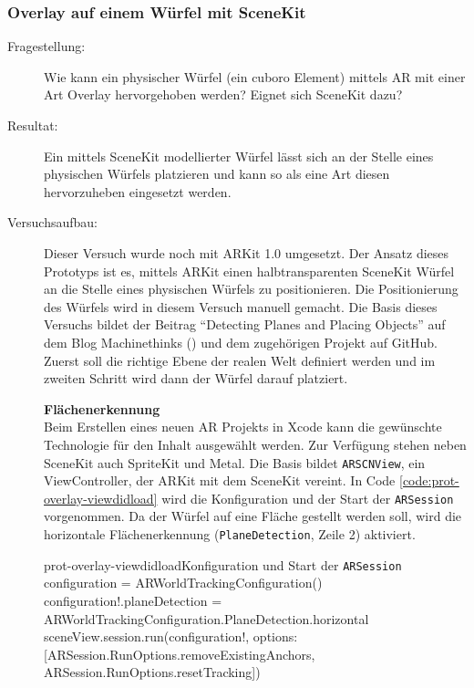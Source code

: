 \subsubsection{Overlay auf einem Würfel mit SceneKit}\label{subsub:prot-overlay}
\begin{description}
	\item[Fragestellung:] Wie kann ein physischer Würfel (ein cuboro Element) mittels AR mit einer Art Overlay hervorgehoben werden? Eignet sich SceneKit dazu?
	\item[Resultat:] Ein mittels SceneKit modellierter Würfel lässt sich an der Stelle eines physischen Würfels platzieren und kann so als eine Art diesen hervorzuheben eingesetzt werden. %
	\item[Versuchsaufbau:] Dieser Versuch wurde noch mit ARKit 1.0 umgesetzt. Der Ansatz dieses Prototyps ist es, mittels ARKit einen halbtransparenten SceneKit Würfel an die Stelle eines physischen Würfels zu positionieren. Die Positionierung des Würfels wird in diesem Versuch manuell gemacht. Die Basis dieses Versuchs bildet der Beitrag "`Detecting Planes and Placing Objects"' auf dem Blog Machinethinks (\cite{arkit-dectingplanes-placingobjects}) und dem zugehörigen Projekt auf GitHub. Zuerst soll die richtige Ebene der realen Welt definiert werden und im zweiten Schritt wird dann der Würfel darauf platziert.

	\textbf{Flächenerkennung}\\
	Beim Erstellen eines neuen AR Projekts in Xcode kann die gewünschte Technologie für den Inhalt ausgewählt werden. Zur Verfügung stehen neben SceneKit auch SpriteKit und Metal. Die Basis bildet \texttt{ARSCNView}, ein ViewController, der ARKit mit dem SceneKit vereint. In Code \ref{code:prot-overlay-viewdidload} wird die Konfiguration und der Start der \texttt{ARSession} vorgenommen. Da der Würfel auf eine Fläche gestellt werden soll, wird die horizontale Flächenerkennung (\texttt{PlaneDetection}, Zeile 2) aktiviert.

	\begin{code}{prot-overlay-viewdidload}{Konfiguration und Start der \texttt{ARSession}}
		configuration = ARWorldTrackingConfiguration()
		configuration!.planeDetection = ARWorldTrackingConfiguration.PlaneDetection.horizontal
		sceneView.session.run(configuration!, options: [ARSession.RunOptions.removeExistingAnchors, ARSession.RunOptions.resetTracking])
	\end{code}


\end{description}
